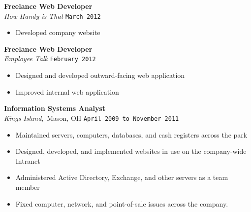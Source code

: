 \documentclass[11pt, line]{res}
\begin{document}
\begin{resume}
			\vspace{-12pt}
				\textbf{Freelance Web Developer} \\
				\textit{How Handy is That}
					\hfill \texttt{March 2012} \\

				\vspace{-14pt}
				\begin{itemize}
					\setlength{\itemsep}{0pt}
					\item Developed company website
				\end{itemize}

			\vspace{-12pt}
				\textbf{Freelance Web Developer} \\
				\textit{Employee Talk}
					\hfill \texttt{February 2012} \\

				\vspace{-14pt}
				\begin{itemize}
					\setlength{\itemsep}{0pt}
					\item Designed and developed outward-facing web application
					\item Improved internal web application
				\end{itemize}

			\vspace{-12pt}
				\textbf{Information Systems Analyst} \\
				\textit{Kings Island},\, Mason, OH
					\hfill \texttt{April 2009 to November 2011} \\

				\vspace{-14pt}
				\begin{itemize}
					\setlength{\itemsep}{0pt}
					\item Maintained servers, computers, databases, and cash registers across the park
					\item Designed, developed, and implemented websites in use on the company-wide Intranet
					\item Administered Active Directory, Exchange, and other servers as a team member
					\item Fixed computer, network, and point-of-sale issues across the company.
				\end{itemize}
	\end{resume}
\end{document}
